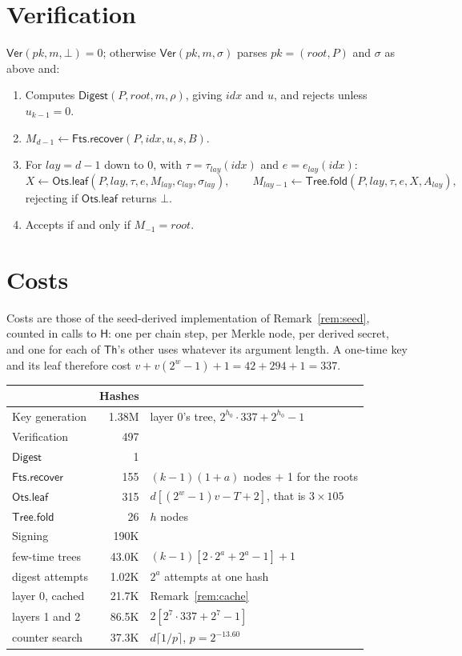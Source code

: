 \documentclass[11pt]{article}
\theoremstyle{definition}
\theoremstyle{plain}
\theoremstyle{remark}
\newcommand{\Th}{\mathsf{Th}}
\newcommand{\Digest}{\mathsf{Digest}}
\newcommand{\Ver}{\mathsf{Ver}}
\newcommand{\hash}{\mathsf{H}}
\newcommand{\pk}{\mathit{pk}}
\newcommand{\rootnode}{\mathit{root}}
\newcommand{\idx}{\mathit{idx}}
\newcommand{\lay}{\mathit{lay}}
\newcommand{\OtsLeaf}{\mathsf{Ots.leaf}}
\newcommand{\TreeFold}{\mathsf{Tree.fold}}
\newcommand{\FtsRec}{\mathsf{Fts.recover}}
\begin{document}
\section{Verification}
\label{sec:ver}

$\Ver(\pk,m,\bot)=0$; otherwise $\Ver(\pk,m,\sigma)$ parses $\pk=(\rootnode,P)$ and $\sigma$ as above and:
\begin{enumerate}[leftmargin=2em]
\item Computes $\Digest(P,\rootnode,m,\rho)$, giving $\idx$ and $u$, and rejects unless $u_{k-1}=0$.
\item $M_{d-1}\gets\FtsRec(P,\idx,u,s,B)$.
\item For $\lay=d-1$ down to $0$, with $\tau=\tau_\lay(\idx)$ and $e=e_\lay(\idx)$:
\[
  X\gets\OtsLeaf(P,\lay,\tau,e,M_\lay,c_\lay,\sigma_\lay),\qquad
  M_{\lay-1}\gets\TreeFold(P,\lay,\tau,e,X,A_\lay),
\]
rejecting if $\OtsLeaf$ returns $\bot$.
\item Accepts if and only if $M_{-1}=\rootnode$.
\end{enumerate}

\section{Costs}
\label{sec:costs}

Costs are those of the seed-derived implementation of Remark~\ref{rem:seed}, counted in calls to $\hash$: one per chain step, per Merkle node, per derived secret, and one for each of $\Th$'s other uses whatever its argument length. A one-time key and its leaf therefore cost $v+v(2^w-1)+1=42+294+1=337$.

\begin{center}
\begin{tabular}{@{}lrl@{}}
\toprule
 & Hashes & \\
\midrule
Key generation & 1.38M & layer $0$'s tree, $2^{h_0}\cdot337+2^{h_0}-1$\\
Verification & 497 & \\
\quad $\Digest$ & 1 & \\
\quad $\FtsRec$ & 155 & $(k-1)(1+a)$ nodes $+$ 1 for the roots\\
\quad $\OtsLeaf$ & 315 & $d\left[(2^w-1)v-T+2\right]$, that is $3\times105$\\
\quad $\TreeFold$ & 26 & $h$ nodes\\
Signing & 190K & \\
\quad few-time trees & 43.0K & $(k-1)\left[2\cdot2^a+2^a-1\right]+1$\\
\quad digest attempts & 1.02K & $2^a$ attempts at one hash\\
\quad layer $0$, cached & 21.7K & Remark~\ref{rem:cache}\\
\quad layers 1 and 2 & 86.5K & $2\left[2^{7}\cdot337+2^{7}-1\right]$\\
\quad counter search & 37.3K & $d\lceil1/p\rceil$, $p=2^{-13.60}$\\
\bottomrule
\end{tabular}
\end{center}
\end{document}
